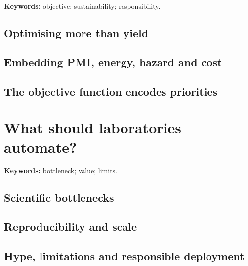 \begin{warningbox}
\textbf{Keywords:} objective; sustainability; responsibility.
\end{warningbox}

\subsection{Optimising more than yield}


\subsection{Embedding PMI, energy, hazard and cost}


\subsection{The objective function encodes priorities}


\section{What should laboratories automate?}

\begin{insightbox}
\textbf{Keywords:} bottleneck; value; limits.
\end{insightbox}

\subsection{Scientific bottlenecks}


\subsection{Reproducibility and scale}


\subsection{Hype, limitations and responsible deployment}

